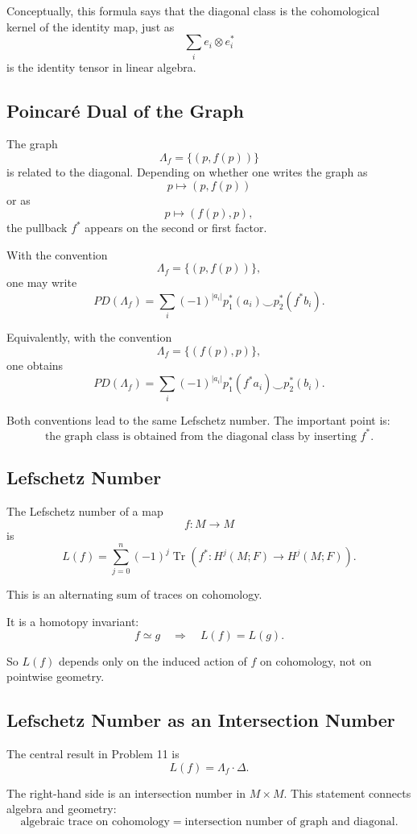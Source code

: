 \documentclass[12pt,a4paper]{article}
\theoremstyle{notespace}
\begin{document}
Conceptually, this formula says that the diagonal class is the cohomological
kernel of the identity map, just as
\[
\sum_i e_i\otimes e_i^*
\]
is the identity tensor in linear algebra.

\subsection{Poincar\'e Dual of the Graph}

The graph
\[
\Lambda_f=\{(p,f(p))\}
\]
is related to the diagonal. Depending on whether one writes the graph as
\[
p\longmapsto (p,f(p))
\]
or as
\[
p\longmapsto (f(p),p),
\]
the pullback \(f^*\) appears on the second or first factor.

With the convention
\[
\Lambda_f=\{(p,f(p))\},
\]
one may write
\[
PD(\Lambda_f)
=
\sum_i (-1)^{|a_i|}
p_1^*(a_i)\smile p_2^*(f^*b_i).
\]

Equivalently, with the convention
\[
\Lambda_f=\{(f(p),p)\},
\]
one obtains
\[
PD(\Lambda_f)
=
\sum_i (-1)^{|a_i|}
p_1^*(f^*a_i)\smile p_2^*(b_i).
\]

Both conventions lead to the same Lefschetz number. The important point is:
\[
\boxed{
	\text{the graph class is obtained from the diagonal class by inserting }f^*.
}
\]

\subsection{Lefschetz Number}

The Lefschetz number of a map
\[
f:M\to M
\]
is
\[
L(f)=\sum_{j=0}^{n}(-1)^j
\operatorname{Tr}
\left(
f^*:H^j(M;F)\to H^j(M;F)
\right).
\]

This is an alternating sum of traces on cohomology.

It is a homotopy invariant:
\[
f\simeq g
\quad\Longrightarrow\quad
L(f)=L(g).
\]

So \(L(f)\) depends only on the induced action of \(f\) on cohomology, not on
pointwise geometry.

\subsection{Lefschetz Number as an Intersection Number}

The central result in Problem 11 is
\[
L(f)=\Lambda_f\cdot \Delta.
\]

The right-hand side is an intersection number in \(M\times M\). This statement
connects algebra and geometry:
\[
\text{algebraic trace on cohomology}
=
\text{intersection number of graph and diagonal}.
\]
\end{document}
